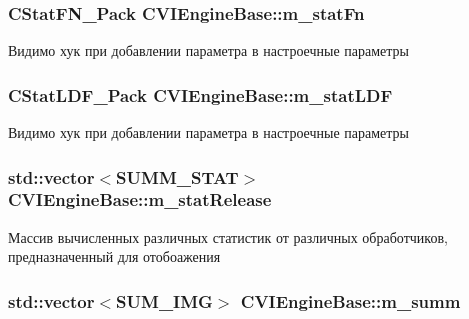 \hypertarget{class_c_v_i_engine_base_a8628211a0ca23ea36cf4059f3ab47f74}{
\subsubsection[{m\+\_\+stat\+Fn}]{\setlength{\rightskip}{0pt plus 5cm}C\+Stat\+F\+N\+\_\+\+Pack C\+V\+I\+Engine\+Base\+::m\+\_\+stat\+Fn}}\label{class_c_v_i_engine_base_a8628211a0ca23ea36cf4059f3ab47f74}


Видимо хук при добавлении параметра в настроечные параметры 

\hypertarget{class_c_v_i_engine_base_abb0ef36905047eafd79bea2911824b7f}{
\subsubsection[{m\+\_\+stat\+L\+D\+F}]{\setlength{\rightskip}{0pt plus 5cm}C\+Stat\+L\+D\+F\+\_\+\+Pack C\+V\+I\+Engine\+Base\+::m\+\_\+stat\+L\+D\+F}}\label{class_c_v_i_engine_base_abb0ef36905047eafd79bea2911824b7f}


Видимо хук при добавлении параметра в настроечные параметры 

\hypertarget{class_c_v_i_engine_base_ab0a3c99fb49cddb42615132833b483d5}{
\subsubsection[{m\+\_\+stat\+Release}]{\setlength{\rightskip}{0pt plus 5cm}std\+::vector$<${\bf S\+U\+M\+M\+\_\+\+S\+T\+A\+T}$>$ C\+V\+I\+Engine\+Base\+::m\+\_\+stat\+Release}}\label{class_c_v_i_engine_base_ab0a3c99fb49cddb42615132833b483d5}


Массив вычисленных различных статистик от различных обработчиков, предназначенный для отобоажения 

\hypertarget{class_c_v_i_engine_base_a29b792994f8c587ebdd4296031032f68}{
\subsubsection[{m\+\_\+summ}]{\setlength{\rightskip}{0pt plus 5cm}std\+::vector$<${\bf S\+U\+M\+\_\+\+I\+M\+G}$>$ C\+V\+I\+Engine\+Base\+::m\+\_\+summ}}\label{class_c_v_i_engine_base_a29b792994f8c587ebdd4296031032f68}


